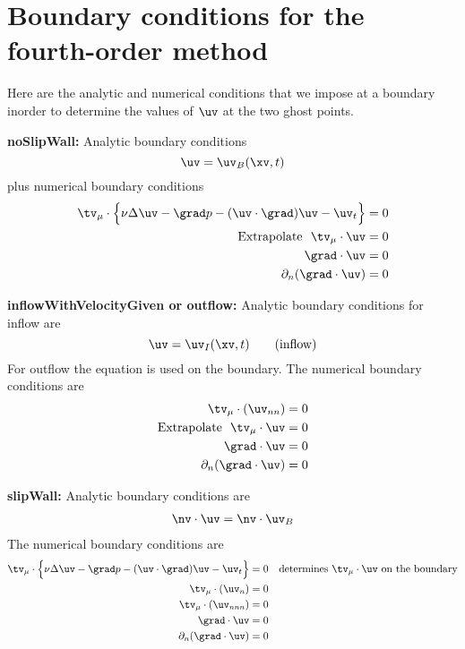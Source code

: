 \documentclass[12pt]{article}
\begin{document}
\clearpage

\newcommand{\nd}{n_d}
\newcommand{\PF}{\sum_{m=1}^{\nd} \grad_4 \ud_{m,i} \cdot D_{4 x_m} \uvd_i}
\newcommand{\Ds}{{\mathcal D}}
\newcommand{\Extrap}{D_{+m}^4}

\section{Boundary conditions for the fourth-order method}

Here are the analytic and numerical conditions that we impose at a boundary inorder
to determine the values of $\uv$ at the two ghost points.

{\bf noSlipWall:} 
Analytic boundary conditions
\[
  \uv = \uv_B(\xv,t)
\]
plus numerical boundary conditions
\begin{align*}
   \tv_\mu\cdot\Big\{ \nu\Delta\uv -\grad p - (\uv\cdot\grad)\uv -\uv_t \Big\} & = 0 \\
   \mbox{Extrapolate~~} \tv_\mu\cdot\uv &=0 \\
   \grad\cdot\uv &= 0 \\
   \partial_n(\grad\cdot\uv) &= 0 \\
\end{align*}


{\bf inflowWithVelocityGiven or outflow:}
Analytic boundary conditions for inflow are
\[
  \uv = \uv_I(\xv,t) \qquad\mbox{(inflow)}
\]
For outflow the equation is used on the boundary.
The numerical boundary conditions are
\begin{align*}
   \tv_\mu\cdot( \uv_{nn} ) &=0 \\
   \mbox{Extrapolate~~} \tv_\mu\cdot\uv &=0 \\
   \grad\cdot\uv &= 0 \\
   \partial_n(\grad\cdot\uv) &= 0 \\
\end{align*}



{\bf slipWall:}
Analytic boundary conditions are
\begin{align*}
   \nv\cdot\uv  = \nv\cdot\uv_B 
\end{align*}
The numerical boundary conditions are
\begin{align*}
    \tv_\mu\cdot\Big\{ \nu\Delta\uv -\grad p - (\uv\cdot\grad)\uv -\uv_t \Big\} & = 0 
                \quad\mbox{determines $\tv_\mu\cdot\uv$ on the boundary} \\  
   \tv_\mu\cdot( \uv_n ) &= 0\\
   \tv_\mu\cdot( \uv_{nnn} ) &= 0\\
   \grad\cdot\uv &= 0 \\
   \partial_n(\grad\cdot\uv) &= 0 \\
\end{align*}
\end{document}
